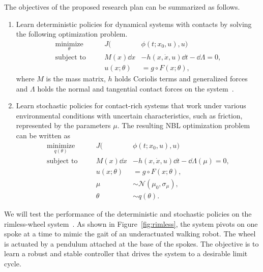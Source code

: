 The objectives of the proposed research plan can be summarized as follows.
\begin{enumerate}
    \item Learn deterministic policies for dynamical systems with contacts by
    solving the following optimization problem.
    \begin{equation}
        \begin{aligned}
            \underset{\theta }{\textrm{minimize}} 
            &&\quad J(&\phi(t; x_0, u), u) \\
            \textrm{subject to} 
            &&\quad M(x)\dd x &- h(x, \dot{x}, u) \dd t - \dd \Lambda= 0, \\
            &&\quad u(x; \theta) &= g \circ F(x; \theta),
        \end{aligned}    
        \label{eq:deter_lcp_opt}%
      \end{equation}
    where $M$ is the mass matrix, $h$ holds Coriolis terms and generalized
    forces and $\Lambda$ holds the normal and tangential contact forces on the
    system~\cite{glocker2005formulation}.
    \item Learn stochastic policies for contact-rich systems that work under
    various environmental conditions with uncertain characteristics, such as
    friction, represented by the parameters $\mu$. The resulting NBL
    optimization problem can be written as
      \begin{equation}
        \begin{aligned}
            \underset{q(\theta) }{\textrm{minimize}} 
            &&\quad J(&\phi(t; x_0, u), u) \\
            \textrm{subject to} 
            &&\quad M(x)\dd x &- h(x, \dot{x}, u) \dd t - \dd \Lambda(\mu)= 0, \\
            &&\quad u(x; \theta) &= g \circ F(x; \theta), \\
            &&\quad \mu &\sim \mathcal{N}(\mu_0, \sigma_\mu), \\
            &&\quad \theta &\sim q(\theta).
        \end{aligned}    
        \label{eq:bays_lcp_opt}%
      \end{equation}
\end{enumerate}


We will test the performance of the deterministic and stochastic policies on the
rimless-wheel system~\cite{sirichotiyakul2019energetically}. As shown in
Figure~\ref{fig:rimless}, the system pivots on one spoke at a time to mimic the
gait of an underactuated walking robot. The wheel is actuated by a pendulum
attached at the base of the spokes. The objective is to learn a robust and 
stable controller that drives the system to a desirable limit cycle.

